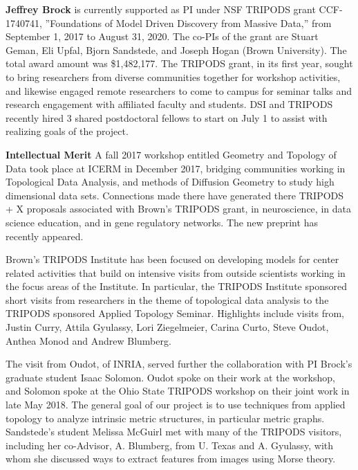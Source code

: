 

\textbf{Jeffrey Brock} is currently supported as PI under NSF TRIPODS grant CCF-1740741, ''Foundations of Model Driven Discovery from Massive Data,'' from September 1, 2017 to August 31, 2020. The co-PIs of the grant are Stuart Geman, Eli Upfal, Bjorn Sandstede, and Joseph Hogan (Brown University). The total award amount was \$1,482,177. The TRIPODS grant, in its first year, sought to bring researchers from diverse communities together for workshop activities, and likewise engaged remote researchers to come to campus for seminar talks and research engagement with affiliated faculty and students. DSI and TRIPODS recently hired 3 shared postdoctoral fellows to start on July 1 to assist with realizing goals of the project.

\textbf{Intellectual Merit} A fall 2017 workshop entitled Geometry and Topology of Data took place at ICERM in December 2017, bridging communities working in Topological Data Analysis, and methods of Diffusion Geometry to study high dimensional data sets. Connections made there have generated there TRIPODS + X proposals associated with Brown's TRIPODS grant, in neuroscience, in data science education, and in gene regulatory networks. The new preprint \citep{Oudot:Solomon:persistence} has recently appeared.

Brown's TRIPODS Institute has been focused on developing models for center related activities that build on intensive visits from outside scientists working in the focus areas of the Institute. In particular, the TRIPODS Institute sponsored short visits from researchers in the theme of topological data analysis to the TRIPODS sponsored Applied Topology Seminar. Highlights include visits from, Justin Curry, Attila Gyulassy, Lori Ziegelmeier, Carina Curto, Steve Oudot, Anthea Monod and Andrew Blumberg.

The visit from Oudot, of INRIA, served further the collaboration with PI Brock's graduate student Isaac Solomon. Oudot spoke on their work at the workshop, and Solomon spoke at the Ohio State TRIPODS workshop on their joint work in late May 2018. The general goal of our project is to use techniques from applied topology to analyze intrinsic metric structures, in particular metric graphs. Sandstede's student Melissa McGuirl met with many of the TRIPODS visitors, including her co-Advisor, A. Blumberg, from U. Texas and A. Gyulassy, with whom she discussed ways to extract features from images using Morse theory. 

